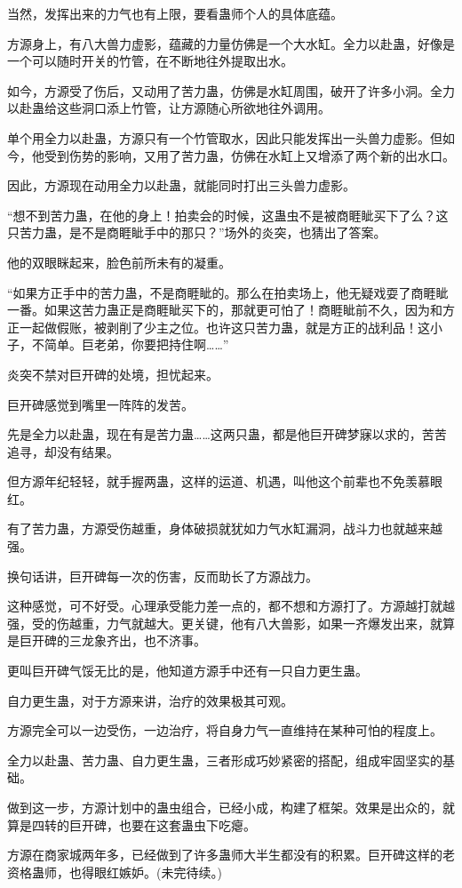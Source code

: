 \begin{this_body}
当然，发挥出来的力气也有上限，要看蛊师个人的具体底蕴。

方源身上，有八大兽力虚影，蕴藏的力量仿佛是一个大水缸。全力以赴蛊，好像是一个可以随时开关的竹管，在不断地往外提取出水。

如今，方源受了伤后，又动用了苦力蛊，仿佛是水缸周围，破开了许多小洞。全力以赴蛊给这些洞口添上竹管，让方源随心所欲地往外调用。

单个用全力以赴蛊，方源只有一个竹管取水，因此只能发挥出一头兽力虚影。但如今，他受到伤势的影响，又用了苦力蛊，仿佛在水缸上又增添了两个新的出水口。

因此，方源现在动用全力以赴蛊，就能同时打出三头兽力虚影。

“想不到苦力蛊，在他的身上！拍卖会的时候，这蛊虫不是被商睚眦买下了么？这只苦力蛊，是不是商睚眦手中的那只？”场外的炎突，也猜出了答案。

他的双眼眯起来，脸色前所未有的凝重。

“如果方正手中的苦力蛊，不是商睚眦的。那么在拍卖场上，他无疑戏耍了商睚眦一番。如果这苦力蛊正是商睚眦买下的，那就更可怕了！商睚眦前不久，因为和方正一起做假账，被剥削了少主之位。也许这只苦力蛊，就是方正的战利品！这小子，不简单。巨老弟，你要把持住啊……”

炎突不禁对巨开碑的处境，担忧起来。

巨开碑感觉到嘴里一阵阵的发苦。

先是全力以赴蛊，现在有是苦力蛊……这两只蛊，都是他巨开碑梦寐以求的，苦苦追寻，却没有结果。

但方源年纪轻轻，就手握两蛊，这样的运道、机遇，叫他这个前辈也不免羡慕眼红。

有了苦力蛊，方源受伤越重，身体破损就犹如力气水缸漏洞，战斗力也就越来越强。

换句话讲，巨开碑每一次的伤害，反而助长了方源战力。

这种感觉，可不好受。心理承受能力差一点的，都不想和方源打了。方源越打就越强，受的伤越重，力气就越大。更关键，他有八大兽影，如果一齐爆发出来，就算是巨开碑的三龙象齐出，也不济事。

更叫巨开碑气馁无比的是，他知道方源手中还有一只自力更生蛊。

自力更生蛊，对于方源来讲，治疗的效果极其可观。

方源完全可以一边受伤，一边治疗，将自身力气一直维持在某种可怕的程度上。

全力以赴蛊、苦力蛊、自力更生蛊，三者形成巧妙紧密的搭配，组成牢固坚实的基础。

做到这一步，方源计划中的蛊虫组合，已经小成，构建了框架。效果是出众的，就算是四转的巨开碑，也要在这套蛊虫下吃瘪。

方源在商家城两年多，已经做到了许多蛊师大半生都没有的积累。巨开碑这样的老资格蛊师，也得眼红嫉妒。(未完待续。)

\end{this_body}

